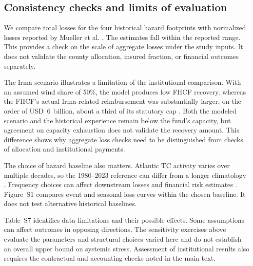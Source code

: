 \subsection*{Consistency checks and limits of evaluation}
We compare total losses for the four historical hazard footprints with normalized losses reported by Mueller et al. \cite{muller_normalized_2025}. The estimates fall within the reported range. This provides a check on the scale of aggregate losses under the study inputs. It does not validate the county allocation, insured fraction, or financial outcomes separately.

The Irma scenario illustrates a limitation of the institutional comparison. With an assumed wind share of 50\%, the model produces low FHCF recovery, whereas the FHCF's actual Irma-related reimbursement was substantially larger, on the order of USD~6~billion, about a third of its statutory cap \cite{fhcf_annual_report_2023}. Both the modeled scenario and the historical experience remain below the fund's capacity, but agreement on capacity exhaustion does not validate the recovery amount. This difference shows why aggregate loss checks need to be distinguished from checks of allocation and institutional payments.

The choice of hazard baseline also matters. Atlantic TC activity varies over multiple decades, so the 1980--2023 reference can differ from a longer climatology \cite{vecchi_changes_2021,emanuel_atlantic_2021,muller_normalized_2025}. Frequency choices can affect downstream losses and financial risk estimates \cite{liu_recalibrating_2026}. Figure~S1 compares event and seasonal loss curves within the chosen baseline. It does not test alternative historical baselines.

Table~S7 identifies data limitations and their possible effects. Some assumptions can affect outcomes in opposing directions. The sensitivity exercises above evaluate the parameters and structural choices varied here and do not establish an overall upper bound on systemic stress. Assessment of institutional results also requires the contractual and accounting checks noted in the main text.

